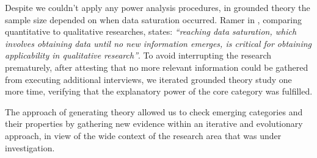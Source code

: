 \documentclass[10pt,journal,letterpaper,compsoc]{IEEEtran}
\begin{document}
Despite we couldn't apply any power analysis procedures, in grounded theory the 
sample size depended on when data saturation occurred. Ramer in \cite{Ramer}, 
comparing quantitative to qualitative researches, states: \textit{``reaching 
data saturation, which involves obtaining data until no new information emerges, 
is critical for obtaining applicability in qualitative research''}. To avoid 
interrupting the research prematurely, after attesting that no more relevant 
information could be gathered from executing additional interviews, we iterated 
grounded theory study one more time, verifying that the explanatory power of the 
core category was fulfilled.

The  approach of generating theory allowed us to check emerging categories 
and their properties by gathering new evidence within an iterative and 
evolutionary approach, in view of the wide context of the research area that was 
under investigation.






%
%


\end{document}
